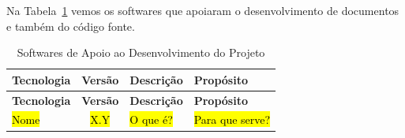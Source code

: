 
Na Tabela~\ref{tabela-software} vemos os softwares que apoiaram o desenvolvimento de documentos e também do código fonte.

\begin{footnotesize}
\begin{longtable}{|p{2.5cm}|c|p{5cm}|p{5.5cm}|}
	\caption{Softwares de Apoio ao Desenvolvimento do Projeto}	
	\label{tabela-software}\\\hline
	
	\rowcolor{lightgray}
	\textbf{Tecnologia} & \textbf{Versão} & \textbf{Descrição} & \textbf{Propósito} \\\hline 
	\endfirsthead
	\hline
	\rowcolor{lightgray}
	\textbf{Tecnologia} & \textbf{Versão} & \textbf{Descrição} & \textbf{Propósito} \\\hline 
	\endhead
		
	\hl{Nome} & \hl{X.Y} & \hl{O que é?} & \hl{Para que serve?} \\ \hline
\end{longtable}
\end{footnotesize}
